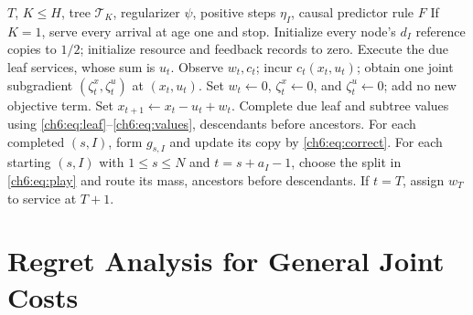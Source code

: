 \documentclass[11pt]{article}
\theoremstyle{plain}
\theoremstyle{remark}
\numberwithin{equation}{section}
\begin{document}
\begin{algorithm}[tb]
\caption{Deadline allocation with joint costs}
\label{ch6:alg:controller}
\begin{algorithmic}[1]
\Require $T$, $K\le H$, tree $\mathcal{T}_K$, regularizer $\psi$, positive
 steps $\eta_I$, causal predictor rule $F$
\State If $K=1$, serve every arrival at age one and stop.
\State Initialize every node's $d_I$ reference copies to $1/2$;
 initialize resource and feedback records to zero.
 \State Execute the due leaf services, whose sum is $u_t$.
  \State Observe $w_t,c_t$; incur $c_t(x_t,u_t)$; obtain one joint
  subgradient $(\zeta_t^x,\zeta_t^u)$ at $(x_t,u_t)$.
 \Else
  \State Set $w_t\gets0$, $\zeta_t^x\gets0$, and $\zeta_t^u\gets0$; add no new objective term.
 \EndIf
 \State Set $x_{t+1}\gets x_t-u_t+w_t$.
 \State Complete due leaf and subtree values using \eqref{ch6:eq:leaf}--\eqref{ch6:eq:values},
 descendants before ancestors.
 \State For each completed $(s,I)$, form $g_{s,I}$ and update its copy
 by \eqref{ch6:eq:correct}.
 \State For each starting $(s,I)$ with $1\le s\le N$ and
 $t=s+a_I-1$, choose the split in \eqref{ch6:eq:play} and route its mass,
 ancestors before descendants.
 \State If $t=T$, assign $w_T$ to service at $T+1$.
\EndFor
\end{algorithmic}
\end{algorithm}

\section{Regret Analysis for General Joint Costs}
\label{ch6:sec:analysis}
\end{document}
